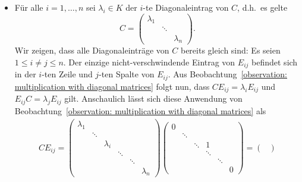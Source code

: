 \begin{itemize}
  \item
    Für alle $i = 1, \dotsc, n$ sei $\lambda_i \in K$ der $i$-te Diagonaleintrag von $C$, d.h.\ es gelte
    \[
        C
      = \begin{pmatrix}
          \lambda_1 &         &           \\
                    & \ddots  &           \\
                    &         & \lambda_n
        \end{pmatrix}.
    \]
    Wir zeigen, dass alle Diagonaleinträge von $C$ bereits gleich sind:
    Es seien $1 \leq i \neq j \leq n$.
    Der einzige nicht-verschwindende Eintrag von $E_{ij}$ befindet sich in der $i$-ten Zeile und $j$-ten Spalte von $E_{ij}$.
    Aus Beobachtung~\ref{observation: multiplication with diagonal matrices} folgt nun, dass $C E_{ij} = \lambda_i E_{ij}$ und $E_{ij} C = \lambda_j E_{ij}$ gilt.
    Anschaulich lässt sich diese Anwendung von Beobachtung~\ref{observation: multiplication with diagonal matrices} als
    \begin{gather*}
        C E_{ij}
      = \begin{pmatrix}
          \lambda_1 &         &           &         &         &           \\
                    & \ddots  &           &         &         &           \\
                    &         & \lambda_i &         &         &           \\
                    &         &           & \ddots  &         &           \\
                    &         &           &         & \ddots  &           \\
                    &         &           &         &         & \lambda_n
        \end{pmatrix}
        \begin{pmatrix}
          0 &         &         &           &         &   \\
            & \ddots  &         &           &         &   \\
            &         & \ddots  & 1         &         &   \\
            &         &         & \ddots    &         &   \\
            &         &         &           & \ddots  &   \\
            &         &         &           &         & 0
        \end{pmatrix}
      = \begin{pmatrix}

\end{pmatrix}
\end{gather*}
\end{itemize}
